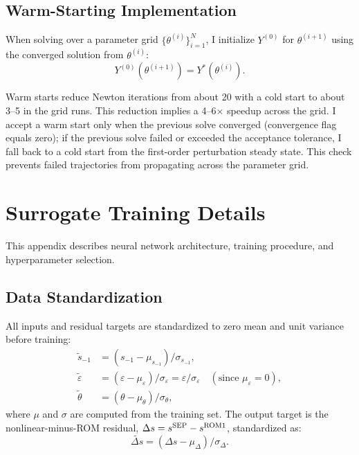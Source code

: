 \documentclass[12pt]{article}
\theoremstyle{plain}
\theoremstyle{definition}
\theoremstyle{remark}
\newcommand{\eps}{\varepsilon}
\begin{document}
\subsection{Warm-Starting Implementation}

When solving over a parameter grid $\{\theta^{(i)}\}_{i=1}^N$, I initialize $Y^{(0)}$ for $\theta^{(i+1)}$ using the converged solution from $\theta^{(i)}$:
\begin{equation}
Y^{(0)}(\theta^{(i+1)}) = Y^*(\theta^{(i)}).
\end{equation}

Warm starts reduce Newton iterations from about 20 with a cold start to about 3--5 in the grid runs. This reduction implies a 4--6$\times$ speedup across the grid. I accept a warm start only when the previous solve converged (convergence flag equals zero); if the previous solve failed or exceeded the acceptance tolerance, I fall back to a cold start from the first-order perturbation steady state. This check prevents failed trajectories from propagating across the parameter grid.


\section{Surrogate Training Details}
\label{app:surrogate}

This appendix describes neural network architecture, training procedure, and hyperparameter selection.


\subsection{Data Standardization}

All inputs and residual targets are standardized to zero mean and unit variance before training:
\begin{align}
\tilde{s}_{-1} &= (s_{-1} - \mu_{s_{-1}})/\sigma_{s_{-1}}, \\
\tilde{\eps} &= (\eps - \mu_\eps)/\sigma_\eps = \eps/\sigma_\eps \quad (\text{since } \mu_\eps=0), \\
\tilde{\theta} &= (\theta - \mu_\theta)/\sigma_\theta,
\end{align}
where $\mu$ and $\sigma$ are computed from the training set. The output target is the nonlinear-minus-ROM residual, $\Delta s = s^{\rm SEP} - s^{\rm ROM1}$, standardized as:
\begin{equation}
\widetilde{\Delta s} = (\Delta s - \mu_{\Delta})/\sigma_{\Delta}.
\end{equation}
\end{document}
